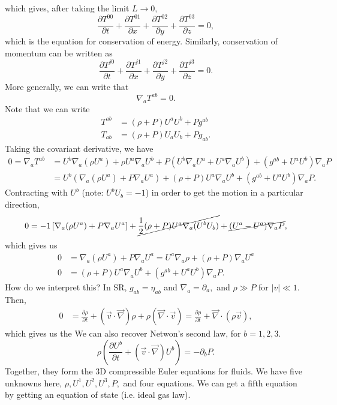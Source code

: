 \documentclass{article}
\numberwithin{equation}{section}
\begin{document}
which gives, after taking the limit $L\to 0,$
\begin{equation}
    \frac{\partial T^{00}}{\partial t} + \frac{\partial T^{01}}{\partial x} + \frac{\partial T^{02}}{\partial y} + \frac{\partial T^{03}}{\partial z} = 0,
\end{equation}
which is the equation for conservation of energy. Similarly, conservation of momentum can be written as 
\begin{equation}
    \frac{\partial T^{j0}}{\partial t} + \frac{\partial T^{j1}}{\partial x} + \frac{\partial T^{j2}}{\partial y} + \frac{\partial T^{j3}}{\partial z} = 0.
\end{equation}
More generally, we can write that 
\begin{equation*}
    \nabla_a T^{ab} = 0.
\end{equation*}
Note that we can write 
\begin{align*}
    T^{ab} &= (\rho + P)U^aU^b + Pg^{ab} \\ 
    T_{ab} &= (\rho+P)U_aU_b + Pg_{ab}.
\end{align*}
Taking the covariant derivative, we have 
\begin{align*}
    0 = \nabla_a T^{ab} &= U^b\nabla_a(\rho U^a) + \rho U^a \nabla_a U^b + P\left(U^b \nabla_a U^a + U^a\nabla_a U^b\right) + (g^{ab} + U^aU^b)\nabla_aP \\ 
    &= U^b\left(\nabla_a(\rho U^a) + P\nabla_a U^a\right) + (\rho+P)U^a \nabla_a U^b + (g^{ab}+U^aU^b)\nabla_a P.
\end{align*}
Contracting with $U^b$ (note: $U^bU_b = -1$) in order to get the motion in a particular direction, 
\begin{align*}
    0 = -1\left[\nabla_a(\rho U^a) + P\nabla_a U^a\right] + \cancel{\frac{1}{2}(\rho+P)U^a\nabla_a(U^bU_b)} + \cancel{(U^a-U^a)\nabla_a P},
\end{align*}
which gives us 
\begin{align*}
    0 &= \nabla_a(\rho U^a) + P\nabla_a U^a = U^a\nabla_a\rho + (\rho+P)\nabla_aU^a\\ 
    0 &= (\rho+P)U^a \nabla_a U^b + (g^{ab}+U^aU^b)\nabla_a P.
\end{align*}
How do we interpret this? In SR, $g_{ab}=\eta_{ab}$ and $\nabla_a = \partial_a,$ and $\rho \gg P$ for $|v| \ll 1.$ Then,
\begin{align*}
    0 &= \frac{\partial \rho}{\partial t} + (\vec{v}\cdot \vec{\nabla})\rho + \rho\left(\vec{\nabla} \cdot \vec{v}\right) = \frac{\partial \rho}{\partial t} + \vec{\nabla} \cdot \left(\rho \vec{v}\right),
\end{align*}
which gives us the  We can also recover Netwon's second law, for $b=1,2,3.$
\begin{equation*}
    \rho\left(\frac{\partial U^b}{\partial t} + (\vec{v}\cdot \vec{\nabla})U^b\right) = -\partial_b P.
\end{equation*}
Together, they form the 3D compressible Euler equations for fluids. We have five unknowns here, $\rho, U^1,U^2,U^3,P,$ and four equations. We can get a fifth equation by getting an equation of state (i.e. ideal gas law). 
\end{document}
